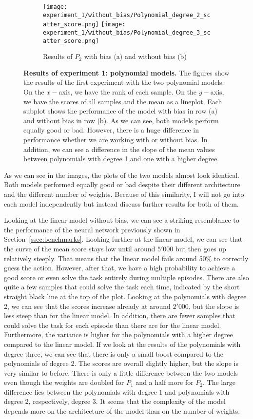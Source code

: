 \begin{figure}[!ht]
\begin{subfigure}{\textwidth}
\begin{figrow}
{\texttt{[image: experiment\_1/without\_bias/Polynomial\_degree\_2\_scatter\_score.png]}
\texttt{[image: experiment\_1/without\_bias/Polynomial\_degree\_3\_scatter\_score.png]}}
\end{figrow}
\vspace*{-5mm}
\caption{Results of $P_2$ with bias (a) and without bias (b)}
\label{fig:results_p2}
\end{subfigure}
\caption[Results of experiment 1: polynomial models]{
  \textbf{Results of experiment 1: polynomial models.}
   The figures show the results of the first experiment with the two polynomial models. On the $x-$axis, we have the rank of each sample. On the $y-$axis, we have the scores of all samples and the mean as a lineplot. Each subplot shows the performance of the model with bias in row (a) and without bias in row (b). As we can see, both models perform equally good or bad. However, there is a huge difference in performance whether we are working with or without bias. In addition, we can see a difference in the slope of the mean values between polynomials with degree 1 and one with a higher degree.
}
\label{fig:experiment_1_polynomial}
\end{figure}
As we can see in the images, the plots of the two models almost look identical. Both models performed equally good or bad despite their different architecture and the different number of weights. Because of this similarity, I will not go into each model independently but instead discuss further results for both of them.

Looking at the linear model without bias, we can see a striking resemblance to the performance of the neural network previously shown in Section~\ref{ssec:benchmarks}. Looking further at the linear model, we can see that the curve of the mean score stays low until around $5'000$ but then goes up relatively steeply. That means that the linear model fails around 50\% to correctly guess the action. However, after that, we have a high probability to achieve a good score or even solve the task entirely during multiple episodes. There are also quite a few samples that could solve the task each time, indicated by the short straight black line at the top of the plot. Looking at the polynomials with degree 2, we can see that the scores increase already at around $2'000$, but the slope is less steep than for the linear model. In addition, there are fewer samples that could solve the task for each episode than there are for the linear model. Furthermore, the variance is higher for the polynomials with a higher degree compared to the linear model. If we look at the results of the polynomials with degree three, we can see that there is only a small boost compared to the polynomials of degree 2. The scores are overall slightly higher, but the slope is very similar to before. There is only a little difference between the two models even though the weights are doubled for $P_1$ and a half more for $P_2$. The large difference lies between the polynomials with degree 1 and polynomials with degree 2, respectively, degree 3. It seems that the complexity of the model depends more on the architecture of the model than on the number of weights.

